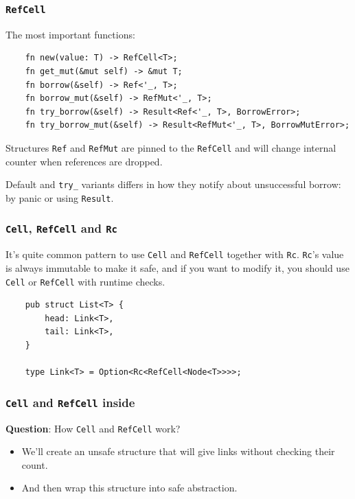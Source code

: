 \documentclass[aspectratio=1610,t]{beamer}
\begin{document}

\begin{frame}[fragile]
\frametitle{\texttt{RefCell}}
The most important functions:

\begin{verbatim}
    fn new(value: T) -> RefCell<T>;
    fn get_mut(&mut self) -> &mut T;
    fn borrow(&self) -> Ref<'_, T>;
    fn borrow_mut(&self) -> RefMut<'_, T>;
    fn try_borrow(&self) -> Result<Ref<'_, T>, BorrowError>;
    fn try_borrow_mut(&self) -> Result<RefMut<'_, T>, BorrowMutError>;
\end{verbatim}

Structures \texttt{Ref} and \texttt{RefMut} are pinned to the \texttt{RefCell} and will change internal counter when references are dropped.

Default and \texttt{try\_} variants differs in how they notify about unsuccessful borrow: by panic or using \texttt{Result}.
\end{frame}


\begin{frame}[fragile]
\frametitle{\texttt{Cell}, \texttt{RefCell} and \texttt{Rc}}
It's quite common pattern to use \texttt{Cell} and \texttt{RefCell} together with \texttt{Rc}. \texttt{Rc}'s value is always immutable to make it safe, and if you want to modify it, you should use \texttt{Cell} or \texttt{RefCell} with runtime checks.

\begin{verbatim}
    pub struct List<T> {
        head: Link<T>,
        tail: Link<T>,
    }

    type Link<T> = Option<Rc<RefCell<Node<T>>>>;
\end{verbatim}
\end{frame}


\begin{frame}[fragile]
\frametitle{\texttt{Cell} and \texttt{RefCell} inside}
\textbf{Question}: How \texttt{Cell} and \texttt{RefCell} work?


\begin{itemize}
    \item<2-> We'll create an unsafe structure that will give links without checking their count.
    \item<3-> And then wrap this structure into safe abstraction.
\end{itemize}

\end{frame}
\end{document}
